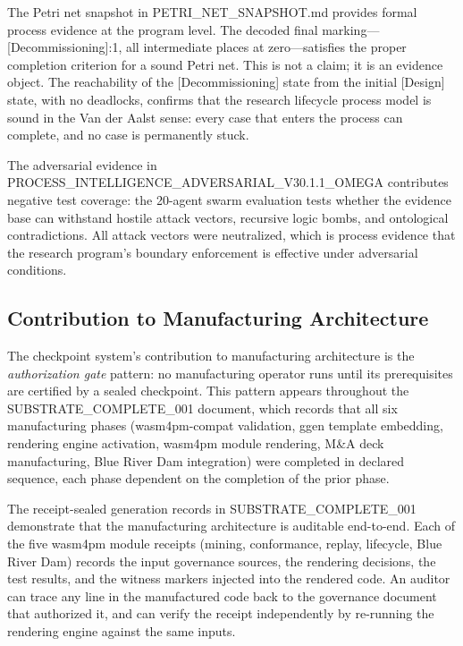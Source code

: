 The Petri net snapshot in PETRI\_NET\_SNAPSHOT.md provides formal process evidence at the program
level. The decoded final marking---[Decommissioning]:1, all intermediate places at zero---satisfies
the proper completion criterion for a sound Petri net. This is not a claim; it is an evidence
object. The reachability of the [Decommissioning] state from the initial [Design] state, with no
deadlocks, confirms that the research lifecycle process model is sound in the Van der Aalst sense:
every case that enters the process can complete, and no case is permanently stuck.

The adversarial evidence in PROCESS\_INTELLIGENCE\_ADVERSARIAL\_V30.1.1\_OMEGA contributes negative
test coverage: the 20-agent swarm evaluation tests whether the evidence base can withstand hostile
attack vectors, recursive logic bombs, and ontological contradictions. All attack vectors were
neutralized, which is process evidence that the research program's boundary enforcement is effective
under adversarial conditions.

\subsection{Contribution to Manufacturing Architecture}
\label{sec:checkpoints-contribution-manufacturing}

The checkpoint system's contribution to manufacturing architecture is the \emph{authorization gate}
pattern: no manufacturing operator runs until its prerequisites are certified by a sealed checkpoint.
This pattern appears throughout the SUBSTRATE\_COMPLETE\_001 document, which records that all six
manufacturing phases (wasm4pm-compat validation, ggen template embedding, rendering engine
activation, wasm4pm module rendering, M\&A deck manufacturing, Blue River Dam integration) were
completed in declared sequence, each phase dependent on the completion of the prior phase.

The receipt-sealed generation records in SUBSTRATE\_COMPLETE\_001 demonstrate that the manufacturing
architecture is auditable end-to-end. Each of the five wasm4pm module receipts (mining, conformance,
replay, lifecycle, Blue River Dam) records the input governance sources, the rendering decisions, the
test results, and the witness markers injected into the rendered code. An auditor can trace any
line in the manufactured code back to the governance document that authorized it, and can verify
the receipt independently by re-running the rendering engine against the same inputs.

